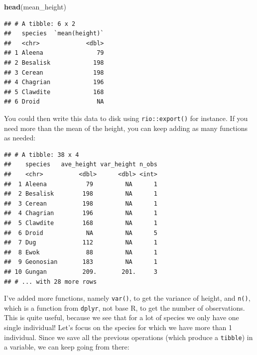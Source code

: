 \documentclass[]{gitbook}
\newenvironment{Shaded}{\begin{snugshade}}{\end{snugshade}}
\newcommand{\DataTypeTok}[1]{\textcolor[rgb]{0.13,0.29,0.53}{#1}}
\newcommand{\KeywordTok}[1]{\textcolor[rgb]{0.13,0.29,0.53}{\textbf{#1}}}
\newcommand{\NormalTok}[1]{#1}
\newcommand{\OperatorTok}[1]{\textcolor[rgb]{0.81,0.36,0.00}{\textbf{#1}}}
\newcommand{\StringTok}[1]{\textcolor[rgb]{0.31,0.60,0.02}{#1}}
\theoremstyle{definition}
\theoremstyle{definition}
\theoremstyle{definition}
\theoremstyle{remark}
\begin{document}
\begin{Shaded}
\begin{Highlighting}[]
\KeywordTok{head}\NormalTok{(mean_height)}
\end{Highlighting}
\end{Shaded}

\begin{verbatim}
## # A tibble: 6 x 2
##   species  `mean(height)`
##   <chr>             <dbl>
## 1 Aleena               79
## 2 Besalisk            198
## 3 Cerean              198
## 4 Chagrian            196
## 5 Clawdite            168
## 6 Droid                NA
\end{verbatim}

You could then write this data to disk using \texttt{rio::export()} for
instance. If you need more than the mean of the height, you can keep
adding as many functions as needed:

\begin{Shaded}
\end{Shaded}

\begin{verbatim}
## # A tibble: 38 x 4
##    species   ave_height var_height n_obs
##    <chr>          <dbl>      <dbl> <int>
##  1 Aleena           79         NA      1
##  2 Besalisk        198         NA      1
##  3 Cerean          198         NA      1
##  4 Chagrian        196         NA      1
##  5 Clawdite        168         NA      1
##  6 Droid            NA         NA      5
##  7 Dug             112         NA      1
##  8 Ewok             88         NA      1
##  9 Geonosian       183         NA      1
## 10 Gungan          209.       201.     3
## # ... with 28 more rows
\end{verbatim}

I've added more functions, namely \texttt{var()}, to get the variance of
height, and \texttt{n()}, which is a function from \texttt{dplyr}, not
base R, to get the number of observations. This is quite useful, because
we see that for a lot of species we only have one single individual!
Let's focus on the species for which we have more than 1 individual.
Since we save all the previous operations (which produce a
\texttt{tibble}) in a variable, we can keep going from there:
\end{document}
